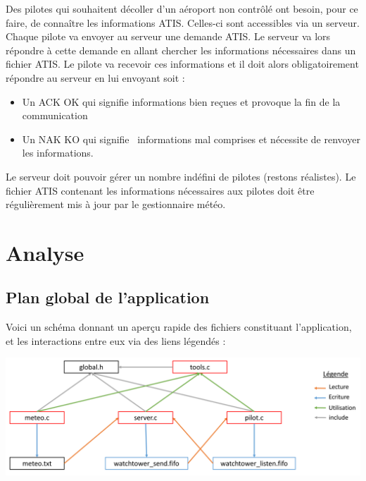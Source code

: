 \documentclass{report}
\begin{document}
		Des pilotes qui souhaitent décoller d’un aéroport non contrôlé ont besoin, pour ce faire, de connaître les informations ATIS. Celles-ci sont accessibles via un serveur.
		Chaque pilote va envoyer au serveur une demande ATIS. Le serveur va lors répondre à cette demande en allant chercher les informations nécessaires dans un fichier ATIS.
		Le pilote va recevoir ces informations et il doit alors obligatoirement répondre au serveur en lui envoyant soit :\newline
		\begin{itemize}
			\item Un ACK OK qui signifie \og informations bien reçues \fg et provoque la fin de la communication
			\item Un NAK KO qui signifie \og informations mal comprises \fg et nécessite de renvoyer les informations.
		\end{itemize}

		Le serveur doit pouvoir gérer un nombre indéfini de pilotes (restons réalistes).
		Le fichier ATIS contenant les informations nécessaires aux pilotes doit être régulièrement mis à jour par le gestionnaire météo.

\chapter{Analyse}

	\section{Plan global de l'application}
		Voici un schéma donnant un aperçu rapide des fichiers constituant l'application, et les interactions entre eux via des liens légendés : \newline

		\includegraphics[width=\linewidth, frame]{schemasProjet.png} \newline
\end{document}
